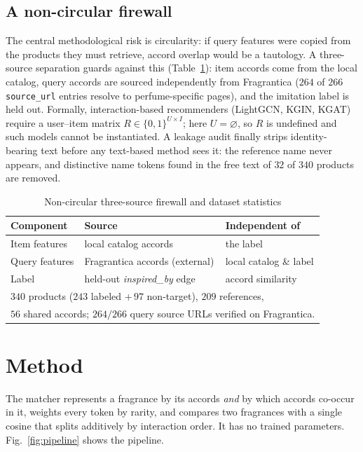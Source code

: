 \documentclass[conference]{IEEEtran}
\begin{document}
\subsection{A non-circular firewall}
The central methodological risk is circularity: if query features were copied from the
products they must retrieve, accord overlap would be a tautology. A three-source separation
guards against this (Table~\ref{tab:firewall}): item accords come from the local catalog,
query accords are sourced independently from Fragrantica ($264$ of $266$ \texttt{source\_url}
entries resolve to perfume-specific pages), and the imitation label is held out. Formally,
interaction-based recommenders (LightGCN, KGIN, KGAT) require a user--item matrix
$R\in\{0,1\}^{U\times I}$; here $U=\varnothing$, so $R$ is undefined and such models cannot be
instantiated. A leakage audit finally strips identity-bearing text before any text-based
method sees it: the reference name never appears, and distinctive name tokens found in the
free text of $32$ of $340$ products are removed.

\begin{table}[t]
\caption{Non-circular three-source firewall and dataset statistics}
\begin{center}
\begin{tabular}{lll}
\toprule
\textbf{Component} & \textbf{Source} & \textbf{Independent of} \\
\midrule
Item features  & local catalog accords              & the label \\
Query features & Fragrantica accords (external)     & local catalog \& label \\
Label          & held-out \textit{inspired\_by} edge & accord similarity \\
\midrule
\multicolumn{3}{l}{\footnotesize $340$ products ($243$ labeled $+\,97$ non-target), $209$ references,} \\
\multicolumn{3}{l}{\footnotesize $56$ shared accords; $264/266$ query source URLs verified on Fragrantica.} \\
\bottomrule
\end{tabular}
\label{tab:firewall}
\end{center}
\end{table}

\section{Method}\label{sec:method}
The matcher represents a fragrance by its accords \emph{and} by which accords co-occur in it,
weights every token by rarity, and compares two fragrances with a single cosine that splits
additively by interaction order. It has no trained parameters. Fig.~\ref{fig:pipeline} shows
the pipeline.
\end{document}
